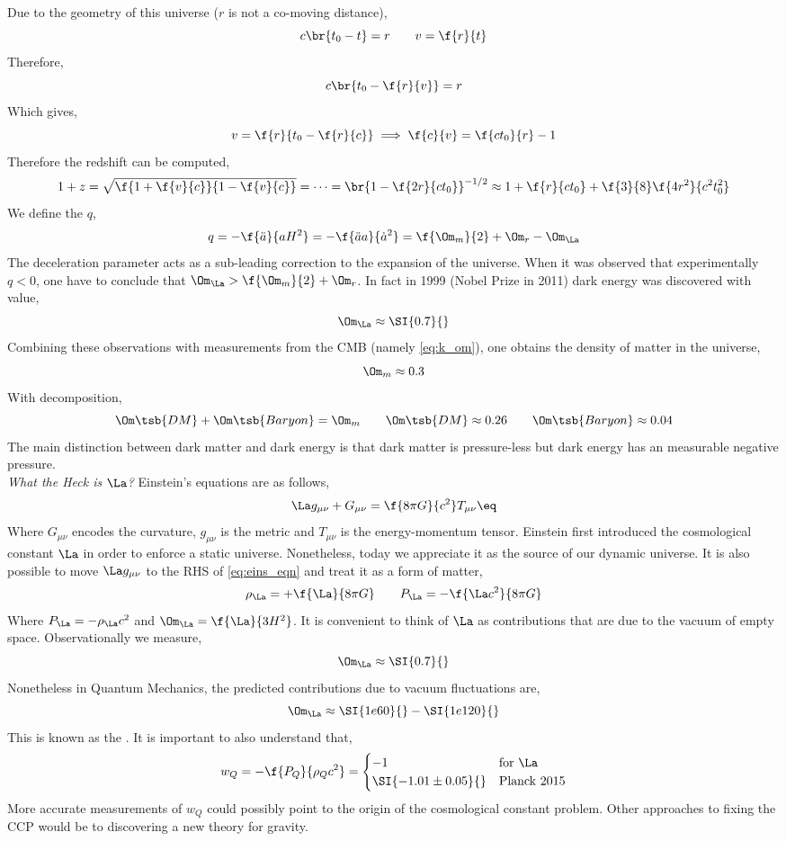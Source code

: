 \documentclass{article}
\begin{document}
Due to the geometry of this universe ($r$ is not a co-moving distance),
\[ c\br{t_0 - t} = r \qquad v = \f{r}{t} \]
Therefore,
\[ c\br{t_0 - \f{r}{v}} = r \]
Which gives,
\[ v = \f{r}{t_0 - \f{r}{c}} \implies \f{c}{v} = \f{ct_0}{r} - 1 \]
Therefore the redshift can be computed,
\[ 1 + z = \sqrt{\f{1 + \f{v}{c}}{1 - \f{v}{c}}} = \cdots = \br{1 - \f{2r}{ct_0}}^{-1/2} \approx 1 + \f{r}{ct_0} + \f{3}{8}\f{4 r^2 }{c^2t_0^2} \]
We define the  $q$,
\[ q = -\f{\ddot a}{aH^2} = -\f{\ddot a a}{\dot a^2} = \f{\Om_m}{2} + \Om_r - \Om_{\La} \]
The deceleration parameter acts as a sub-leading correction to the expansion of the universe. When it was observed that experimentally $q < 0$, one have to conclude that $\Om_{\La} > \f{\Om_m}{2} + \Om_r$. In fact in 1999 (Nobel Prize in 2011) dark energy was discovered with value,
\[ \Om_{\La} \approx \SI{0.7}{} \]
Combining these observations with measurements from the CMB (namely \cref{eq:k_om}), one obtains the density of matter in the universe,
\[ \Om_{m} \approx 0.3  \]
With decomposition,
\[ \Om\tsb{DM} + \Om\tsb{Baryon} = \Om_{m} \qquad \Om\tsb{DM} \approx 0.26 \qquad \Om\tsb{Baryon} \approx 0.04 \]
The main distinction between dark matter and dark energy is that dark matter is pressure-less but dark energy has an measurable negative pressure. \\

\textit{What the Heck is $\La$?} Einstein's equations are as follows,
\[ \La g_{\mu \nu} + G_{\mu \nu} = \f{8 \pi G}{c^2} T_{\mu \nu } \eq \label{eq:eins_eqn}\]
Where $G_{\mu \nu}$ encodes the curvature, $g_{\mu \nu}$ is the metric and $T_{\mu\nu}$ is the energy-momentum tensor. Einstein first introduced the cosmological constant $\La$ in order to enforce a static universe. Nonetheless, today we appreciate it as the source of our dynamic universe. It is also possible to move $\La g_{\mu \nu}$ to the RHS of \cref{eq:eins_eqn} and treat it as a form of matter,
\[ \rho_{\La} = + \f{\La}{8 \pi G} \qquad P_{\La} = - \f{\La c^2}{8 \pi G} \]
Where $P_{\La} = - \rho_{\La} c^2$ and $\Om_{\La} = \f{\La}{3 H^2}$. It is convenient to think of $\La$ as contributions that are due to the vacuum of empty space. Observationally we measure,
\[ \Om_{\La} \approx \SI{0.7}{} \]
Nonetheless in Quantum Mechanics, the predicted contributions due to vacuum fluctuations are,
\[ \Om_{\La} \approx \SI{1e60}{} - \SI{1e120}{} \]
This is known as the . It is important to also understand that,
\[ w_{Q} = - \f{P_Q}{\rho_Q c^2} = \begin{cases}
    -1 & \text{for $\La$}\\
    \SI{-1.01 \pm 0.05}{} & \text{Planck 2015}\\
\end{cases} \]
More accurate measurements of $w_{Q}$ could possibly point to the origin of the cosmological constant problem. Other approaches to fixing the CCP would be to discovering a new theory for gravity.
\end{document}
